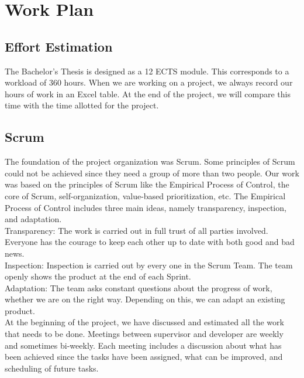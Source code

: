 \documentclass{scrartcl}
\begin{document}
\section{Work Plan}
  		\subsection{Effort Estimation}
  		
  		The Bachelor's Thesis  is designed as a 12 ECTS module. This corresponds to a workload of 360 hours. When we are working on a project, we always record our hours of work in an Excel table.
 At the end of the project, we will compare this time with the time allotted for the project. 		
  		
  		
  		
  		
  		
 	    \subsection{Scrum}  	
 	    The foundation of the project organization was Scrum.
 	    Some principles of Scrum could not be achieved since they need a group of more than two people. 
 	    Our work was based on the principles of Scrum like the Empirical Process of Control, the core of Scrum, self-organization, value-based prioritization, etc.
 	    The Empirical Process of Control includes three main ideas, namely transparency, inspection, and adaptation. \\
 	    Transparency: The work is carried out in full trust of all parties involved. Everyone has the courage to keep each other up to date with both good and bad news. \\ 
 	    Inspection: Inspection is carried out by every one in the Scrum Team. The team openly shows the product at the end of each Sprint.			 \\
 	    Adaptation: The team asks constant questions about the progress of work, whether we are on the right way. Depending on this, we can adapt an existing product.		 \\
 	    
 	    At the beginning of the project, we have discussed and estimated all the work that needs to be done. 
 	    Meetings between supervisor and developer are weekly and sometimes bi-weekly.
 	    Each meeting includes a discussion about what has been achieved 
 	    since the tasks have been assigned, what can be improved, and scheduling of future tasks.
 	    
 	    
 	    
\end{document}
